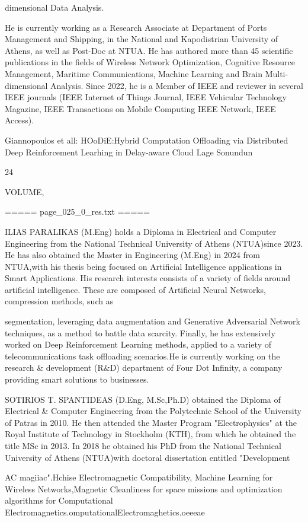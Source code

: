 \documentclass{article}
\begin{document}
dimensional Data Analysis.

He is currently working as a Research Associate at Department of Ports Management and Shipping, in the National and Kapodistrian University of Athens, as well as Post-Doc at NTUA. He has authored more than 45 scientific publications in the fields of Wireless Network Optimization, Cognitive Resource Management, Maritime Communications, Machine Learning and Brain Multi-dimensional Analysis. Since 2022, he is a Member of IEEE and reviewer in several IEEE journals (IEEE Internet of Things Journal, IEEE Vehicular Technology Magazine, IEEE Transactions on Mobile Computing IEEE Network, IEEE Access).

Giannopoulos et all: HOoDiE:Hybrid Computation Offloading via Distributed Deep Reinforcement Learhing in Delay-aware Cloud Lage Sonundun

24

VOLUME,

===== page\_025\_0\_res.txt =====


ILIAS PARALIKAS (M.Eng) holds a Diploma in Electrical and Computer Engineering from the National Technical University of Athens (NTUA)since 2023. He has also obtained the Master in Engineering (M.Eng) in 2024  from NTUA,with his thesis being focused on Artificial Intelligence applications in Smart Applications. His research interests consists of a variety of fields around artificial intelligence. These are composed of Artificial Neural Networks, compression methods, such as

segmentation, leveraging data augmentation and Generative Adversarial Network techniques, as a method to battle data scarcity. Finally, he has extensively worked on Deep Reinforcement Learning methods, applied to a variety of telecommunications task offloading scenarios.He is currently working on the research \& development (R\&D) department of Four Dot Infinity, a company providing smart solutions to businesses.

SOTIRIOS T. SPANTIDEAS (D.Eng, M.Sc,Ph.D) obtained the Diploma of Electrical \& Computer Engineering from the Polytechnic School of the University of Patras in 2010. He then attended the Master Program "Electrophysics" at the Royal Institute of Technology in Stockholm (KTH), from which he obtained the title MSc in 2013. In 2018 he obtained his PhD from the National Technical University of Athens (NTUA)with doctoral dissertation entitled "Development

AC magiiac".Hchise Electromagnetic Compatibility, Machine Learning for Wireless Networks,Magnetic Cleanliness for space missions and optimization algorithms for Computational Electromagnetics.omputationalElectromaghetics.oeeeae
\end{document}
